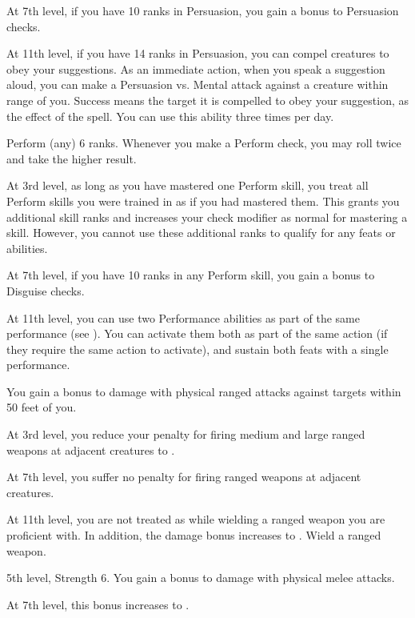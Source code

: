     At 7th level, if you have 10 ranks in Persuasion, you gain a  bonus to Persuasion checks.

    At 11th level, if you have 14 ranks in Persuasion, you can compel creatures to obey your suggestions.
    As an immediate action, when you speak a suggestion aloud, you can make a Persuasion vs. Mental attack against a creature within \rngmed range of you.
    Success means the target it is compelled to obey your suggestion, as the effect of the  spell.
    You can use this ability three times per day.
    \magical

    \featpre Perform (any) 6 ranks.
    \featben Whenever you make a Perform check, you may roll twice and take the higher result.

    At 3rd level, as long as you have mastered one Perform skill, you treat all Perform skills you were trained in as if you had mastered them.
    This grants you additional skill ranks and increases your check modifier as normal for mastering a skill.
    However, you cannot use these additional ranks to qualify for any feats or abilities.

    At 7th level, if you have 10 ranks in any Perform skill, you gain a  bonus to Disguise checks.

    At 11th level, you can use two Performance abilities as part of the same performance (see ).
    You can activate them both as part of the same action (if they require the same action to activate), and sustain both feats with a single performance.

    \featben You gain a  bonus to damage with physical ranged attacks against targets within 50 feet of you.

    At 3rd level, you reduce your penalty for firing medium and large ranged weapons at adjacent creatures to .

    At 7th level, you suffer no penalty for firing ranged weapons at adjacent creatures.

    At 11th level, you are not treated as  while wielding a ranged weapon you are proficient with.
    In addition, the damage bonus increases to .
    \stylereq Wield a ranged weapon.

    \featpres 5th level, Strength 6.
    \featben You gain a  bonus to damage with physical melee attacks.

    At 7th level, this bonus increases to .


